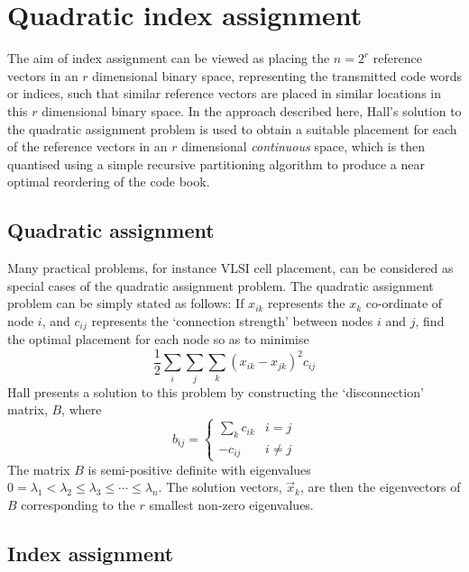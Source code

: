 \documentclass[12pt,a4paper]{report}
\begin{document}
\chapter{Quadratic index assignment}

The aim of index assignment can be viewed as placing the $n=2^r$ reference
vectors in an $r$ dimensional binary space, representing the transmitted code
words or indices, such that similar reference vectors are placed in similar
locations in this $r$ dimensional binary space.  In the approach described
here, Hall's solution to the quadratic assignment problem is used
to obtain a suitable placement for each of the reference vectors in an $r$
dimensional \emph{continuous} space, which is then quantised using a simple
recursive partitioning algorithm to produce a near optimal reordering of the
code book.
\section{Quadratic assignment}

Many practical problems, for instance VLSI cell placement, can
be considered as special cases of the quadratic assignment problem.  The
quadratic assignment problem can be simply stated as follows:  If $x_{ik}$
represents the $x_k$ co-ordinate of node $i$, and $c_{ij}$ represents the
`connection strength' between nodes $i$ and $j$, find the optimal placement
for each node so as to minimise
%
\begin{displaymath}
   \frac{1}{2}\sum_i\sum_j\sum_k(x_{ik}-x_{jk})^2c_{ij}
\end{displaymath}
%
Hall presents a solution to this problem by constructing the
`disconnection' matrix, $B$, where
%
\begin{displaymath}
   b_{ij} =
   \left\{
   \begin{array}{ll}
   \sum_k c_{ik} & i = j\\
   -c_{ij} & i \neq j
   \end{array}
   \right.
\end{displaymath}
%
The matrix $B$ is semi-positive definite with eigenvalues
$0 = \lambda_1 < \lambda_2 \leq \lambda_3 \leq \cdots \leq \lambda_n$.
The solution vectors, $\vec{x}_k$, are then the eigenvectors of $B$
corresponding to the $r$ smallest non-zero eigenvalues.

\section{Index assignment}
\end{document}
